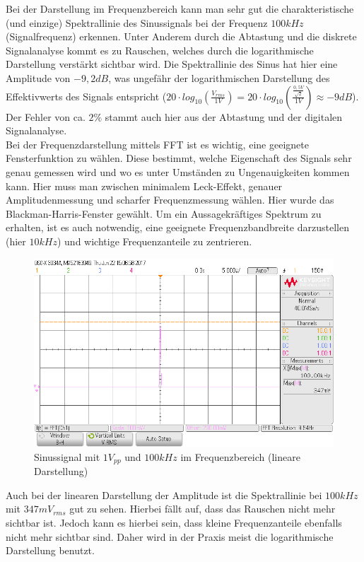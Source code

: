 \documentclass[12pt,a4paper,titlepage]{article}
\begin{document}
\noindent Bei der Darstellung im Frequenzbereich kann man sehr gut die charakteristische (und einzige) Spektrallinie des Sinussignals bei der Frequenz $100kHz$ (Signalfrequenz) erkennen. Unter Anderem durch die Abtastung und die diskrete Signalanalyse kommt es zu Rauschen, welches durch die logarithmische Darstellung verstärkt sichtbar wird. Die Spektrallinie des Sinus hat hier eine Amplitude von $-9,2dB$, was ungefähr der logarithmischen Darstellung des Effektivwerts des Signals entspricht ($20 \cdot log_{10} (\frac{V_{rms}}{1V}) = 20 \cdot log_{10} \left(\frac{\frac{0,5V}{\sqrt{2}}}{1V}\right) \approx -9dB$). Der Fehler von ca. $2\%$ stammt auch hier aus der Abtastung und der digitalen Signalanalyse.\\

\noindent Bei der Frequenzdarstellung mittels FFT ist es wichtig, eine geeignete Fensterfunktion zu wählen. Diese bestimmt, welche Eigenschaft des Signals sehr genau gemessen wird und wo es unter Umständen zu Ungenauigkeiten kommen kann. Hier muss man zwischen minimalem Leck-Effekt, genauer Amplitudenmessung und scharfer Frequenzmessung wählen. Hier wurde das Blackman-Harris-Fenster gewählt. Um ein Aussagekräftiges Spektrum zu erhalten, ist es auch notwendig, eine geeignete Frequenzbandbreite darzustellen (hier $10kHz$) und wichtige Frequenzanteile zu zentrieren.

\begin{figure}[H]
  \centering
  \includegraphics[width=150mm]{scope_37.png}
  \caption{Sinussignal mit $1V_{pp}$ und $100kHz$ im Frequenzbereich (lineare Darstellung)}
\end{figure}

\noindent Auch bei der linearen Darstellung der Amplitude ist die Spektrallinie bei $100kHz$ mit $347mV_{rms}$ gut zu sehen. Hierbei fällt auf, dass das Rauschen nicht mehr sichtbar ist. Jedoch kann es hierbei sein, dass kleine Frequenzanteile ebenfalls nicht mehr sichtbar sind. Daher wird in der Praxis meist die logarithmische Darstellung benutzt.
\end{document}
